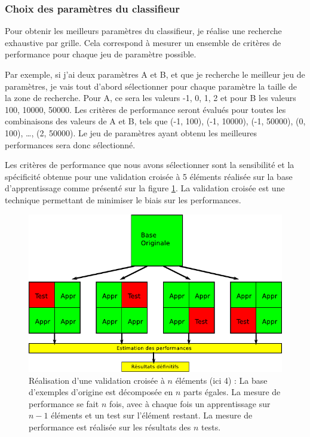 \subsubsection{Choix des paramètres du classifieur}

Pour obtenir les meilleurs paramètres du classifieur, je réalise une recherche exhaustive par grille. Cela correspond à mesurer un ensemble de critères de performance pour chaque jeu de paramètre possible.

Par exemple, si j'ai deux paramètres A et B, et que je recherche le meilleur jeu de paramètres, je vais tout d'abord sélectionner pour chaque paramètre la taille de la zone de recherche. Pour A, ce sera les valeurs {-1, 0, 1, 2} et pour B les valeurs {100, 10000, 50000}. Les critères de performance seront évalués pour toutes les combinaisons des valeurs de A et B, tels que (-1, 100), (-1, 10000), (-1, 50000), (0, 100), \dots, (2, 50000). Le jeu de paramètres ayant obtenu les meilleures performances sera donc sélectionné. 

Les critères de performance que nous avons sélectionner sont la sensibilité et la spécificité obtenue pour une validation croisée à 5 éléments réalisée sur la base d'apprentissage comme présenté sur la figure \ref{fig:crossValid}. La validation croisée est une technique permettant de minimiser le biais sur les performances.

\begin{figure}[h!]
 \includegraphics[width=15cm]{images/crossValid}
 \caption{Réalisation d'une validation croisée à $n$ éléments (ici 4) : La base d'exemples d'origine est décomposée en $n$ parts égales. La mesure de performance se fait $n$ fois, avec à chaque fois un apprentissage sur $n-1$ éléments et un test sur l'élément restant. La mesure de performance est réalisée sur les résultats des $n$ tests.}
 \label{fig:crossValid}
\end{figure}


